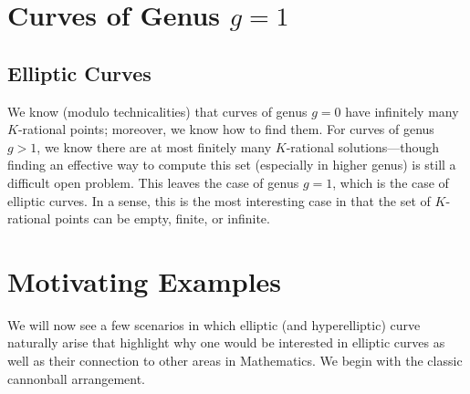 \section{Curves of Genus $g= 1$\label{sec:genus1}}

\subsection{Elliptic Curves\label{sec:g1ec}}

We know (modulo technicalities) that curves of genus $g= 0$ have infinitely many $K$-rational points; moreover, we know how to find them. For curves of genus $g > 1$, we know there are at most finitely many $K$-rational solutions---though finding an effective way to compute this set (especially in higher genus) is still a difficult open problem. This leaves the case of genus $g= 1$, which is the case of elliptic curves. In a sense, this is the most interesting case in that the set of $K$-rational points can be empty, finite, or infinite. 


\section{Motivating Examples\label{sec:motivex}}

We will now see a few scenarios in which elliptic (and hyperelliptic) curve naturally arise that highlight why one would be interested in elliptic curves as well as their connection to other areas in Mathematics. We begin with the classic cannonball arrangement.


